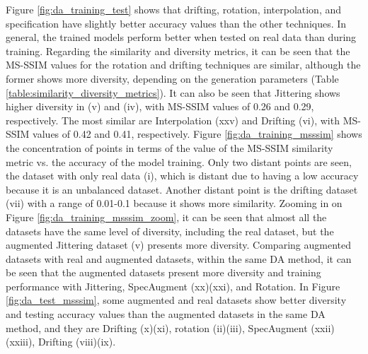 \documentclass[journal]{IEEEtran}
\begin{document}
Figure \ref{fig:da_training_test} shows that drifting, rotation, interpolation, and specification have slightly better accuracy values than the other techniques. In general, the trained models perform better when tested on real data than during training.
Regarding the similarity and diversity metrics, it can be seen that the MS-SSIM values for the rotation and drifting techniques are similar, although the former shows more diversity, depending on the generation parameters (Table \ref{table:similarity_diversity_metrics}).
It can also be seen that Jittering shows higher diversity in (v) and (iv), with MS-SSIM values of 0.26 and 0.29, respectively.
The most similar are Interpolation (xxv) and Drifting (vi), with MS-SSIM values of 0.42 and 0.41, respectively.
Figure \ref{fig:da_training_msssim} shows the concentration of points in terms of the value of the MS-SSIM similarity metric vs. the accuracy of the model training. Only two distant points are seen, the dataset with only real data (i), which is distant due to having a low accuracy because it is an unbalanced dataset. Another distant point is the drifting dataset (vii) with a range of 0.01-0.1 because it shows more similarity. Zooming in on Figure \ref{fig:da_training_msssim_zoom}, it can be seen that almost all the datasets have the same level of diversity, including the real dataset, but the augmented Jittering dataset (v) presents more diversity. Comparing augmented datasets with real and augmented datasets, within the same DA method, it can be seen that the augmented datasets present more diversity and training performance with Jittering, SpecAugment (xx)(xxi), and Rotation.
In Figure \ref{fig:da_test_msssim}, some augmented and real datasets show  better diversity and testing accuracy values than the augmented datasets in the same DA method, and they are Drifting (x)(xi), rotation (ii)(iii), SpecAugment (xxii)(xxiii), Drifting (viii)(ix).





%
%
\end{document}
